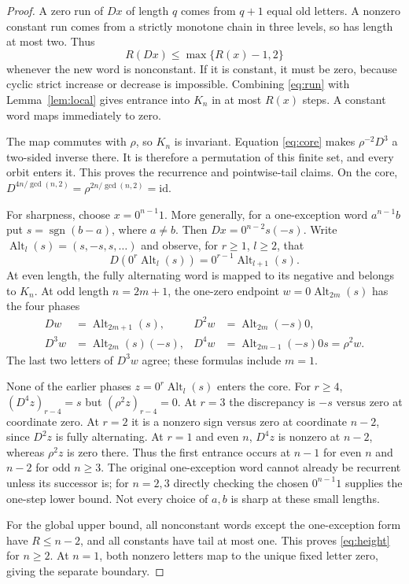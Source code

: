 \documentclass[a4paper,10pt]{amsart}
\theoremstyle{remark}
\newcommand{\sgn}{\operatorname{sgn}}
\newcommand{\Alt}{\operatorname{Alt}}
\begin{document}
\begin{proof}
A zero run of $Dx$ of length $q$ comes from $q+1$ equal old letters.
A nonzero constant run comes from a strictly monotone chain in three levels,
so has length at most two. Thus
\begin{equation}\label{eq:run}
R(Dx)\le\max\{R(x)-1,2\}
\end{equation}
whenever the new word is nonconstant. If it is constant, it must be zero,
because cyclic strict increase or decrease is impossible. Combining
\eqref{eq:run} with Lemma~\ref{lem:local} gives entrance into $K_n$ in at
most $R(x)$ steps. A constant word maps immediately to zero.

The map commutes with $\rho$, so $K_n$ is invariant. Equation
\eqref{eq:core} makes $\rho^{-2}D^3$ a two-sided inverse there. It is
therefore a permutation of this finite set, and every orbit enters it.
This proves the recurrence and pointwise-tail claims. On the core,
$D^{4n/\gcd(n,2)}=\rho^{2n/\gcd(n,2)}=\mathrm{id}$.

For sharpness, choose $x=0^{n-1}1$. More generally, for a one-exception
word $a^{n-1}b$ put $s=\sgn(b-a)$, where $a\ne b$.
Then $Dx=0^{n-2}s(-s)$. Write $\Alt_l(s)=(s,-s,s,\ldots)$ and observe,
for $r\ge1$, $l\ge2$, that
\begin{equation}\label{eq:witness}
D(0^r\Alt_l(s))=0^{r-1}\Alt_{l+1}(s).
\end{equation}
At even length, the fully alternating word is mapped to its negative
and belongs to $K_n$. At odd length $n=2m+1$, the one-zero endpoint
$w=0\Alt_{2m}(s)$ has the four phases
\begin{align*}
Dw&=\Alt_{2m+1}(s),&D^2w&=\Alt_{2m}(-s)0,\\
D^3w&=\Alt_{2m}(s)(-s),&D^4w&=\Alt_{2m-1}(-s)0s=\rho^2w.
\end{align*}
The last two letters of $D^3w$ agree; these formulas include $m=1$.

None of the earlier phases $z=0^r\Alt_l(s)$ enters the core. For $r\ge4$,
$(D^4z)_{r-4}=s$ but $(\rho^2z)_{r-4}=0$. At $r=3$ the discrepancy
is $-s$ versus zero at coordinate zero. At $r=2$ it is a nonzero sign
versus zero at coordinate $n-2$, since $D^2z$ is fully alternating.
At $r=1$ and even $n$, $D^4z$ is nonzero at $n-2$, whereas $\rho^2z$
is zero there. Thus the first entrance occurs at $n-1$ for even $n$
and $n-2$ for odd $n\ge3$. The original one-exception word cannot
already be recurrent unless its successor is; for $n=2,3$ directly
checking the chosen $0^{n-1}1$ supplies the one-step lower bound.
Not every choice of $a,b$ is sharp at these small lengths.

For the global upper bound, all nonconstant words except the one-exception
form have $R\le n-2$, and all constants have tail at most one. This proves
\eqref{eq:height} for $n\ge2$. At $n=1$, both nonzero letters map to the
unique fixed letter zero, giving the separate boundary.
\end{proof}
\end{document}
